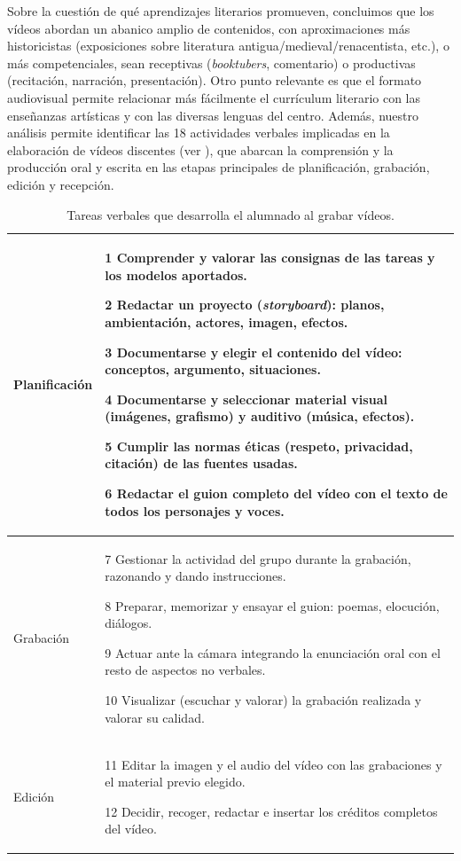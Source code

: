 \documentclass[spanish]{textolivre}
\begin{document}
Sobre la cuestión de qué aprendizajes literarios promueven, concluimos que los vídeos abordan un abanico amplio de contenidos, con aproximaciones más historicistas (exposiciones sobre literatura antigua/medieval/renacentista, etc.), o más competenciales, sean receptivas (\textit{booktubers}, comentario) o productivas (recitación, narración, presentación). Otro punto relevante es que el formato audiovisual permite relacionar más fácilmente el currículum literario con las enseñanzas artísticas y con las diversas lenguas del centro.
Además, nuestro análisis permite identificar las 18 actividades verbales implicadas en la elaboración de vídeos discentes (ver ), que abarcan la comprensión y la producción oral y escrita en las etapas principales de planificación, grabación, edición y recepción.

\begin{table}[htbp]
\caption{Tareas verbales que desarrolla el alumnado al grabar vídeos.}
\label{tbl2}
\centering \small
\begin{tabular}{p{2cm} p{12cm}}
\toprule
Planificación & 1 Comprender y valorar las consignas de las tareas y los modelos aportados.

 2 Redactar un proyecto (\textit{storyboard}): planos, ambientación, actores, imagen, efectos.
 
 3 Documentarse y elegir el contenido del vídeo: conceptos, argumento, situaciones.
 
 4 Documentarse y seleccionar material visual (imágenes, grafismo) y auditivo (música, efectos).
 
 5 Cumplir las normas éticas (respeto, privacidad, citación) de las fuentes usadas.
 
 6 Redactar el guion completo del vídeo con el texto de todos los personajes y voces. \\ 
\midrule
Grabación & 7 Gestionar la actividad del grupo durante la grabación, razonando y dando instrucciones.

 8 Preparar, memorizar y ensayar el guion: poemas, elocución, diálogos.
 
 9 Actuar ante la cámara integrando la enunciación oral con el resto de aspectos no verbales.
 
 10 Visualizar (escuchar y valorar) la grabación realizada y valorar su calidad. \\ 
\midrule
Edición & 11 Editar la imagen y el audio del vídeo con las grabaciones y el material previo elegido.

 12 Decidir, recoger, redactar e insertar los créditos completos del vídeo.
 

\end{tabular}
\end{table}
\end{document}
